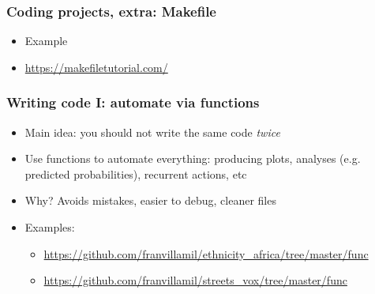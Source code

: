 \documentclass[aspectratio=43]{beamer}
\begin{document}
\begin{frame}
\frametitle{Coding projects, extra: Makefile}
\centering

\begin{itemize}
  \item Example
  \item \href{https://makefiletutorial.com/}{https://makefiletutorial.com/}
\end{itemize}

\end{frame}

\begin{frame}
\frametitle{Writing code I: automate via functions}
\centering

\begin{itemize}
  \item Main idea: you should not write the same code \textit{twice}
  \item Use functions to automate everything: producing plots, analyses (e.g. predicted probabilities), recurrent actions, etc
  \item Why? Avoids mistakes, easier to debug, cleaner files
  \item Examples:
  \begin{itemize}
    \item \href{github.com/franvillamil/ethnicity_vox/tree/master/func}{https://github.com/franvillamil/ethnicity\_africa/tree/master/func}
    \item \href{github.com/franvillamil/streets_vox/tree/master/func}{https://github.com/franvillamil/streets\_vox/tree/master/func}
  \end{itemize}
\end{itemize}

\end{frame}
\end{document}

